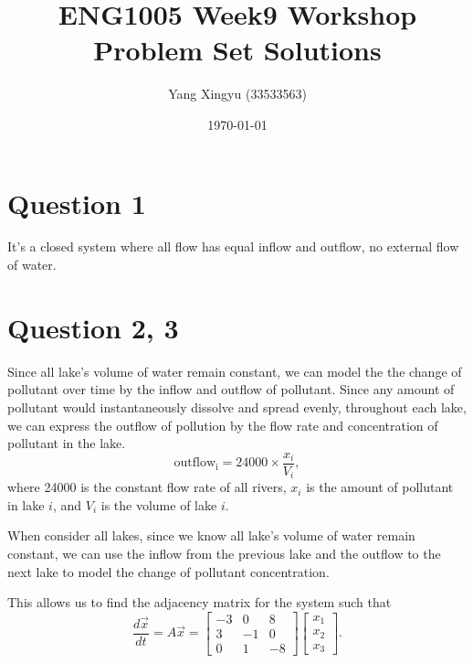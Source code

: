 \documentclass[12pt,a4paper]{article}
\begin{document}
\newcommand{\df}[2]{
    \frac{d#1}{d#2}
}

\title{ENG1005 Week9 Workshop Problem Set Solutions}
\author{Yang Xingyu (33533563)}
\date{\today}
\maketitle

\section*{Question 1}
\begin{solution}
    It's a closed system where all flow has equal inflow and outflow, no external flow of water.
\end{solution}

\section*{Question 2, 3}
\begin{solution}
Since all lake's volume of water remain constant, we can model the the change of pollutant over time by the inflow and outflow of pollutant. Since any amount of pollutant would instantaneously dissolve and spread evenly, throughout each lake, we can express the outflow of pollution by the flow rate and concentration of pollutant in the lake.
\[
\operatorname{outflow_i} = 24000 \times \frac{x_i}{V_i},
\]
where 24000 is the constant flow rate of all rivers, $x_i$ is the amount of pollutant in lake $i$, and $V_i$ is the volume of lake $i$.

When consider all lakes, since we know all lake's volume of water remain constant, we can use the inflow from the previous lake and the outflow to the next lake to model the change of pollutant concentration.

This allows us to find the adjacency matrix for the system such that
\[
\frac{d \Vec{x}}{d t}=A \Vec{x} = 
\left[\begin{array}{ccc}
-3 & 0 & 8 \\
3 & -1 & 0 \\
0 & 1 & -8
\end{array}\right] 
\begin{bmatrix}
    x_1\\x_2\\x_3
\end{bmatrix}.
\]
\end{solution}
\end{document}
